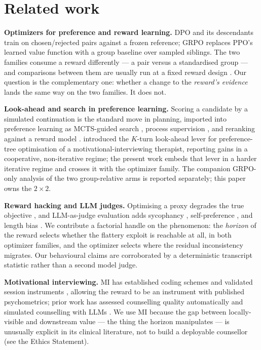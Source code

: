 \section{Related work}
\label{sec:related}

\textbf{Optimizers for preference and reward learning.} DPO \citep{rafailov2023dpo} and its
descendants train on chosen/rejected pairs against a frozen reference; GRPO
\citep{shao2024deepseekmath} replaces PPO's learned value function \citep{schulman2017ppo,
ouyang2022instructgpt} with a group baseline over sampled siblings. The two families consume a
reward differently --- a pair versus a standardised group --- and comparisons between them are
usually run at a fixed reward design \citep[e.g.][]{xu2024dpovsppo}. Our question is the
complementary one: whether a change to the \emph{reward's evidence} lands the same way on the
two families. It does not.

\textbf{Look-ahead and search in preference learning.} Scoring a candidate by a simulated
continuation is the standard move in planning, imported into preference learning as MCTS-guided
search \citep{yu2023promptmcts, xie2024mctsdpo}, process supervision \citep{lightman2024letsverify},
and reranking against a reward model \citep{pace2024westofn}. \citet{baruch2025pto} introduced
the $K$-turn look-ahead lever for preference-tree optimisation of a motivational-interviewing
therapist, reporting gains in a cooperative, non-iterative regime; the present work embeds that
lever in a harder iterative regime and crosses it with the optimizer family. The companion
GRPO-only analysis of the two group-relative arms is reported separately; this paper owns the
$2 \times 2$.

\textbf{Reward hacking and LLM judges.} Optimising a proxy degrades the true objective
\citep{amodei2016concrete, skalse2022defining, pan2022effects, gao2023scaling}, and
LLM-as-judge evaluation \citep{zheng2023judging} adds sycophancy \citep{sharma2024sycophancy,
perez2023discovering}, self-preference \citep{panickssery2024selfpreference}, and length bias
\citep{singhal2024long, dubois2024lengthcontrolled}. We contribute a factorial handle on the
phenomenon: the \emph{horizon} of the reward selects whether the flattery exploit is reachable
at all, in both optimizer families, and the optimizer selects where the residual inconsistency
migrates. Our behavioural claims are corroborated by a deterministic transcript statistic rather
than a second model judge.

\textbf{Motivational interviewing.} MI \citep{miller1991mi} has established coding schemes
\citep{moyers2016miti} and validated session instruments \citep{hatcher2006waisr, larsen1979csq},
allowing the reward to be an instrument with published psychometrics; prior work has assessed
counselling quality automatically \citep{perezrosas2019goodcounselor, yosef2024assessing} and
simulated counselling with LLMs \citep{steenstra2025scaffolding, chen2025broaden}. We use MI
because the gap between locally-visible and downstream value --- the thing the horizon
manipulates --- is unusually explicit in its clinical literature, not to build a deployable
counsellor (see the Ethics Statement).
